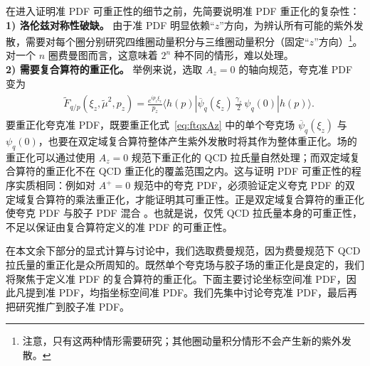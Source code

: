 在进入证明准 PDF 可重正性的细节之前，先简要说明准 PDF 重正化的复杂性：\\
{\bf 1) 洛伦兹对称性破缺。} 由于准 PDF 明显依赖``$z$''方向，为辨认所有可能的紫外发散，需要对每个圈分别研究四维圈动量积分与三维圈动量积分（固定``$z$''方向）\footnote{注意，只有这两种情形需要研究；其他圈动量积分情形不会产生新的紫外发散。}。对一个 $n$ 圈费曼图而言，这意味着 $2^n$ 种不同的情形，难以处理。\\
{\bf 2) 需要复合算符的重正化。} 举例来说，选取 $A_z=0$ 的轴向规范，夸克准 PDF 变为
\begin{align}\label{eq:ftqxAz}
\begin{split}
&\tilde{F}_{q/p}(\xi_z,\tilde{\mu}^2,p_z)= \frac{e^{i p_z \xi_z}}{p_z} \left. \langle h(p)| \overline{\psi}_q(\xi_z)\,\frac{\gamma_z}{2}\, \psi_q(0) | h(p) \rangle\right. .
\end{split}
\end{align}
要重正化夸克准 PDF，既要重正化式~\eqref{eq:ftqxAz} 中的单个夸克场 $\overline{\psi}_q(\xi_z)$ 与 $\psi_q(0)$，也要在双定域复合算符整体产生紫外发散时将其作为整体重正化。场的重正化可以通过使用 $A_z=0$ 规范下重正化的 QCD 拉氏量自然处理；而双定域复合算符的重正化不在 QCD 重正化的覆盖范围之内。这与证明 PDF 可重正性的程序实质相同：例如对 $A^+=0$ 规范中的夸克 PDF，必须验证定义夸克 PDF 的双定域复合算符的乘法重正化，才能证明其可重正性。正是双定域复合算符的重正化使夸克 PDF 与胶子 PDF 混合 \cite{Collins:1981uw}。也就是说，仅凭 QCD 拉氏量本身的可重正性，不足以保证由复合算符定义的准 PDF 的可重正性。


在本文余下部分的显式计算与讨论中，我们选取费曼规范，因为费曼规范下 QCD 拉氏量的重正化是众所周知的。既然单个夸克场与胶子场的重正化是良定的，我们将聚焦于定义准 PDF 的复合算符的重正化。下面主要讨论坐标空间准 PDF，因此凡提到准 PDF，均指坐标空间准 PDF。我们先集中讨论夸克准 PDF，最后再把研究推广到胶子准 PDF。
